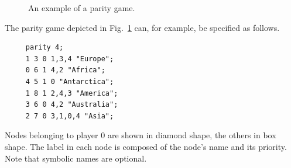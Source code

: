 \begin{figure}[t]
\begin{center}
\end{center}

\caption{An example of a parity game.}
\label{fig:examplegame}
\end{figure}

\begin{example}
\label{ex:examplegame}
The parity game depicted in Fig.~\ref{fig:examplegame} can, for example, be specified as follows.
\begin{verbatim}
     parity 4;
     1 3 0 1,3,4 "Europe";
     0 6 1 4,2 "Africa";
     4 5 1 0 "Antarctica";
     1 8 1 2,4,3 "America";
     3 6 0 4,2 "Australia";
     2 7 0 3,1,0,4 "Asia";
\end{verbatim}
Nodes belonging to player $0$ are shown in diamond shape, the others in box shape. The label in each
node is composed of the node's name and its priority. Note that symbolic names are optional.
\end{example}

